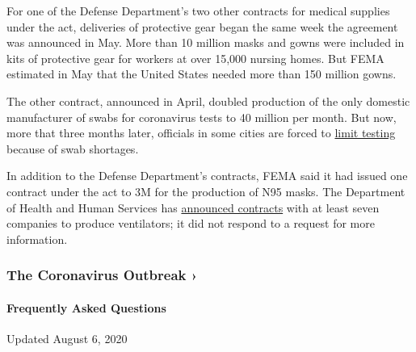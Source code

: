 For one of the Defense Department's two other contracts for medical
supplies under the act, deliveries of protective gear began the same
week the agreement was announced in May. More than 10 million masks and
gowns were included in kits of protective gear for workers at over
15,000 nursing homes. But FEMA estimated in May that the United States
needed more than 150 million gowns.

The other contract, announced in April, doubled production of the only
domestic manufacturer of swabs for coronavirus tests to 40 million per
month. But now, more that three months later, officials in some cities
are forced to
\href{https://www.nytimes.com/2020/07/06/us/coronavirus-test-shortage.html}{limit
testing} because of swab shortages.

In addition to the Defense Department's contracts, FEMA said it had
issued one contract under the act to 3M for the production of N95 masks.
The Department of Health and Human Services has
\href{https://www.hhs.gov/about/news/2020/04/13/hhs-announces-new-ventilator-contracts-orders-now-totaling-over-130000-ventilators.html}{announced
contracts} with at least seven companies to produce ventilators; it did
not respond to a request for more information.

\href{https://www.nytimes.com/news-event/coronavirus?action=click\&pgtype=Article\&state=default\&region=MAIN_CONTENT_3\&context=storylines_faq}{}

\hypertarget{the-coronavirus-outbreak-}{%
\subsubsection{The Coronavirus Outbreak
›}\label{the-coronavirus-outbreak-}}

\hypertarget{frequently-asked-questions}{%
\paragraph{Frequently Asked
Questions}\label{frequently-asked-questions}}

Updated August 6, 2020

